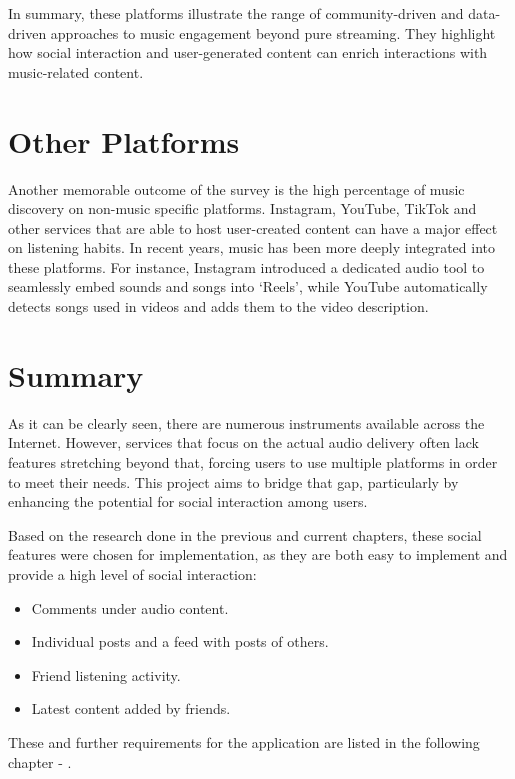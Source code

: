 In summary, these platforms illustrate the range of community-driven and data-driven approaches to music engagement
beyond pure streaming.
They highlight how social interaction and user-generated content can enrich interactions with music-related content.


\section{Other Platforms}
Another memorable outcome of the survey is the high percentage of music discovery on non-music specific platforms.
Instagram, YouTube, TikTok and other services that are able to host user-created content can have a major effect on
listening habits. In recent years, music has been more deeply integrated into these platforms.
For instance, Instagram introduced a dedicated audio tool to seamlessly embed sounds and songs into ‘Reels’\cite{inst_audio},
while YouTube automatically detects songs used in videos and adds them to the video description.


\section*{Summary}
As it can be clearly seen, there are numerous instruments available across the Internet.
However, services that focus on the actual audio delivery often lack features stretching beyond that,
forcing users to use multiple platforms in order to meet their needs. This project aims to bridge that gap,
particularly by enhancing the potential for social interaction among users.

Based on the research done in the previous and current chapters, these social features were chosen for implementation,
as they are both easy to implement and provide a high level of social interaction:

\begin{itemize}
    \item Comments under audio content.
    \item Individual posts and a feed with posts of others.
    \item Friend listening activity.
    \item Latest content added by friends.
\end{itemize}

These and further requirements for the application are listed in the following chapter - .